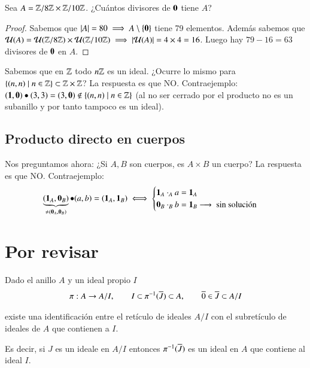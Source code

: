 \begin{ej}
	Sea $A = \mathbb{Z}/8\mathbb{Z} \times \mathbb{Z}/10\mathbb{Z}$. ¿Cuántos divisores de $\mathbf{0}$ tiene $A$?
\end{ej}

\begin{proof}
	Sabemos que $|A| = 80 \implies A \setminus \{\mathbf{0}\}$ tiene 79 elementos. Además sabemos que $\mathcal{U}(A) = \mathcal{U}(\mathbb{Z}/8\mathbb{Z}) \times \mathcal{U}(\mathbb{Z}/10\mathbb{Z}) \implies |\mathcal{U}(A)| = 4 \times 4 = 16$. Luego hay $79 - 16 = 63$ divisores de $\mathbf{0}$ en $A$.
\end{proof}

\begin{ej}
	Sabemos que en $\mathbb{Z}$ todo $n\mathbb{Z}$ es un ideal. ¿Ocurre lo mismo para $\{(n,n) \mid n \in \mathbb{Z}\} \subset \mathbb{Z} \times \mathbb{Z}$? La respuesta es que NO. Contraejemplo: $(\mathbf{1},\mathbf{0}) \bullet (3,3) = (3,\mathbf{0}) \notin \{(n,n) \mid n \in \mathbb{Z}\}$ (al no ser cerrado por el producto no es un subanillo y por tanto tampoco es un ideal).
\end{ej}

\subsection{Producto directo en cuerpos}

Nos preguntamos ahora: ¿Si $A, B$ son cuerpos, es $A \times B$ un cuerpo? La respuesta es que NO. Contraejemplo:
\begin{align*}
	\underbrace{(\mathbf{1}_A,\mathbf{0}_B)}_{\neq (\mathbf{0}_A, \mathbf{0}_B)} \bullet (a,b) = (\mathbf{1}_A, \mathbf{1}_B) \iff \begin{cases}
	\mathbf{1}_A \cdot_A a = \mathbf{1}_A \\
	\mathbf{0}_B \cdot_B b = \mathbf{1}_B \longrightarrow\text{ sin solución }
	\end{cases}
\end{align*}


\section{Por revisar}


\begin{thm}
	Dado el anillo $A$ y un ideal propio $I$
	\begin{align*}
		\pi: A \to A/I,\qquad I \subset \pi^{-1}(\overline{J}) \subset A,\qquad \overline{0} \in \overline{J} \subset A / I
	\end{align*}
	
	existe una identificación entre el retículo de ideales $A / I$ con el subretículo de ideales de $A$ que contienen a $I$. 
	
	Es decir, si $J$ es un ideale en $A/I$ entonces $\pi^{-1}(\overline{J})$ es un ideal en $A$ que contiene al ideal $I$.
\end{thm}


